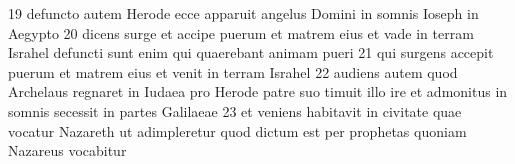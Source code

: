 19 defuncto autem Herode ecce apparuit angelus Domini in somnis Ioseph in Aegypto  20 dicens surge et accipe puerum et matrem eius et vade in terram Israhel defuncti sunt enim qui quaerebant animam pueri  21 qui surgens accepit puerum et matrem eius et venit in terram Israhel  22 audiens autem quod Archelaus regnaret in Iudaea pro Herode patre suo timuit illo ire et admonitus in somnis secessit in partes Galilaeae  23 et veniens habitavit in civitate quae vocatur Nazareth ut adimpleretur quod dictum est per prophetas quoniam Nazareus vocabitur